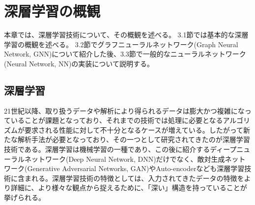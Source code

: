 
\chapter{深層学習の概観} \label{sec:DeepLearning}
本章では、深層学習技術について、その概観を述べる。
3.1節では基本的な深層学習の概観を述べる。%
3.2節でグラフニューラルネットワーク(Graph Neural Network, GNN)について紹介した後、3.3節で一般的なニューラルネットワーク(Neural Network, NN)の実装について説明する。


\section{深層学習}

21世紀以降、取り扱うデータや解析により得られるデータは膨大かつ複雑になっていることが課題となっており、それまでの技術では処理に必要となるアルゴリズムが要求される性能に対して不十分となるケースが増えている。したがって新たな解析手法が必要となっており、その一つとして研究されてきたのが深層学習技術である。深層学習は機械学習の一種であり、この後に紹介するディープニューラルネットワーク(Deep Neural Network, DNN)だけでなく、敵対生成ネットワーク(Generative Adversarial Networks, GAN)やAuto-encoderなども深層学習技術に含まれる。深層学習技術の特徴としては、入力されてきたデータの特徴をより詳細に、より様々な観点から捉えるために、「深い」構造を持っていることが挙げられる。%

